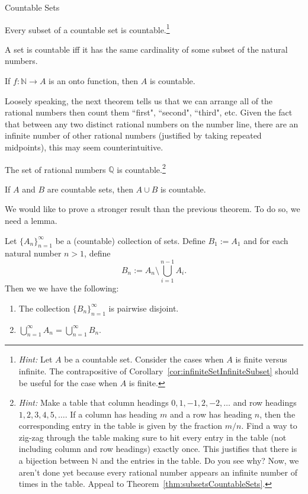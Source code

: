 \begin{section}{Countable Sets}
\begin{theorem}\label{thm:subsetsCountableSets}
Every subset of a countable set is countable.\footnote{\emph{Hint:} Let $A$ be a countable set.  Consider the cases when $A$ is finite versus infinite. The contrapositive of Corollary~\ref{cor:infiniteSetInfiniteSubset} should be useful for the case when $A$ is finite.}
\end{theorem}

\begin{theorem}
A set is countable iff it has the same cardinality of some subset of the natural numbers.
\end{theorem}

\begin{theorem}
If $f:\mathbb{N}\to A$ is an onto function, then $A$ is countable.
\end{theorem}

Loosely speaking, the next theorem tells us that we can arrange all of the rational numbers then count them ``first", ``second", ``third", etc. Given the fact that between any two distinct rational numbers on the number line, there are an infinite number of other rational numbers (justified by taking repeated midpoints), this may seem counterintuitive.  

\begin{theorem}
The set of rational numbers $\mathbb{Q}$ is countable.\footnote{\emph{Hint:} Make a table that column headings $0, 1, -1, 2,-2,\ldots$ and row headings $1,2,3,4,5,\ldots$.  If a column has heading $m$ and a row has heading $n$, then the corresponding entry in the table is given by the fraction $m/n$.  Find a way to zig-zag through the table making sure to hit every entry in the table (not including column and row headings) exactly once.  This justifies that there is a bijection between $\mathbb{N}$ and the entries in the table.  Do you see why?  Now, we aren't done yet because every rational number appears an infinite number of times in the table. Appeal to Theorem~\ref{thm:subsetsCountableSets}.}
\end{theorem}

\begin{theorem}
If $A$ and $B$ are countable sets, then $A\cup B$ is countable.
\end{theorem}

We would like to prove a stronger result than the previous theorem. To do so, we need a lemma.

\begin{lemma}
Let $\{A_n\}_{n=1}^{\infty}$ be a (countable) collection of sets. Define $B_1:=A_1$ and for each natural number $n>1$, define
\[
B_n:=A_n\setminus \bigcup_{i=1}^{n-1}A_i.
\]
Then we we have the following:
\begin{enumerate}[label=\textrm{(\alph*)}]
\item The collection $\{B_n\}_{n=1}^{\infty}$ is pairwise disjoint.
\item $\displaystyle \bigcup_{n=1}^{\infty}A_n =\bigcup_{n=1}^{\infty}B_n$.
\end{enumerate}
\end{lemma}


\end{section}
